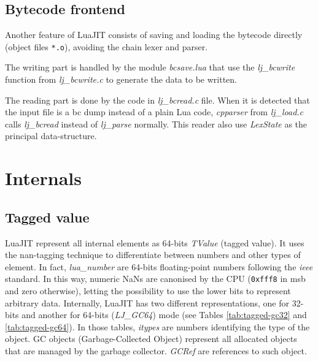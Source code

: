 \subsection{Bytecode frontend}
\label{Subsec:bc-frontend}

Another feature of LuaJIT consists of saving and loading the bytecode directly (object files \texttt{*.o}), avoiding the chain lexer and parser.

The writing part is handled by the module \emph{bcsave.lua} that use the
\emph{lj\_bcwrite} function from \emph{lj\_bcwrite.c} to generate the data to be written.

The reading part is done by the code in \emph{lj\_bcread.c} file. When it is
detected that the input file is a bc dump instead of a plain Lua code,
\emph{cpparser} from \emph{lj\_load.c} calls \emph{lj\_bcread} instead of
\emph{lj\_parse} normally. This reader also use \emph{LexState} as the principal
data-structure.

\section{Internals}

\subsection{Tagged value}
\label{Subsec:tagged-value}

LuaJIT represent all internal elements as 64-bits \emph{TValue} (tagged value).
It uses the nan-tagging technique to differentiate between numbers and other
types of element. In fact, \emph{lua\_number} are 64-bits floating-point numbers
following the \emph{ieee} standard. In this way, numeric NaNs are canonised by the
CPU (\texttt{0xfff8} in msb and zero otherwise), letting the possibility to use the
lower bits to represent arbitrary data. Internally, LuaJIT has two different
representations, one for 32-bits and another for 64-bits (\emph{LJ\_GC64}) mode
(see Tables \ref{tab:tagged-gc32} and \ref{tab:tagged-gc64}). In those tables,
\emph{itypes} are numbers identifying the type of the object.
GC objects (Garbage-Collected Object) represent all allocated objects
that are managed by the garbage collector. \emph{GCRef} are references to such
object.

